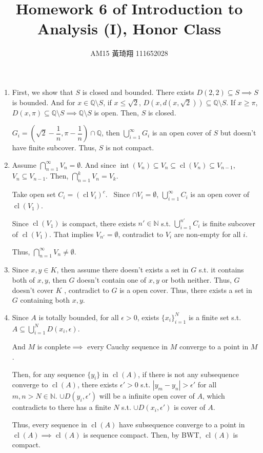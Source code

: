 \documentclass[12pt]{article}
\title{Homework 6 of Introduction to Analysis (I), Honor Class}
\author{AM15 黃琦翔 111652028}
\DeclareMathOperator{\closure}{cl}
\DeclareMathOperator{\interior}{int}
\begin{document}
\maketitle
\begin{enumerate}
    \item First, we show that $S$ is closed and bounded. There exists $D(2, 2) \subseteq S\implies S$ is bounded.
    And for $x\in \mathbb{Q}\setminus S$, if $x\leq \sqrt{2}$, $D(x, d(x, \sqrt{2}))\subseteq \mathbb{Q}\setminus S$. If $x\geq \pi$, $D(x, \pi) \subseteq \mathbb{Q}\setminus S\implies \mathbb{Q}\setminus S$ is open.
    Then, $S$ is closed.

    $G_i = (\sqrt{2} - \dfrac{1}{n}, \pi - \dfrac{1}{n}) \cap \mathbb{Q}$, then $\displaystyle\bigcup_{i=1}^{\infty} G_i$ is an open cover of $S$ but doesn't have finite subcover.
    Thus, $S$ is not compact.

    \item Assume $\displaystyle\bigcap_{n=1}^{\infty} V_n = \emptyset$.
    And since $\interior(V_n) \subseteq V_n \subseteq \closure(V_n) \subseteq V_{n-1}$, $V_n \subseteq V_{n-1}$.
    Then, $\displaystyle\bigcap_{n=1}^{k} V_n = V_k$.

    Take open set $C_i = (\closure V_i)^c$. \
    Since $\cap V_i = \emptyset$, $\displaystyle\bigcup_{i=1}^{\infty} C_i$ is an open cover of $\closure(V_1)$.

    Since $\closure(V_1)$ is compact, there exists $n' \in \mathbb{N}$ s.t. $\displaystyle\bigcup_{i=1}^{n'} C_i$ is finite subcover of $\closure(V_1)$.
    That implies $V_{n'} = \emptyset$, contradict to $V_i$ are non-empty for all $i$.

    Thus, $\displaystyle\bigcap_{n=1}^{\infty} V_n \neq \emptyset$.

    \item Since $x, y\in K$, then assume there doesn't exists a set in $G$ s.t. it contains both of $x, y$, then $G$ doesn't contain one of $x, y$ or both neither.
    Thus, $G$ doesn't cover $K$ , contradict to $G$ is a open cover. Thus, there exists a set in $G$ containing both $x, y$.

    \newpage
    \item Since $A$ is totally bounded, for all $\epsilon > 0$, exists $\lbrace x_i\rbrace_{i=1}^N$ is a finite set s.t. $A \subseteq \displaystyle\bigcup_{i=1}^N D(x_i, \epsilon)$.
    
    And $M$ is conplete$\implies$ every Cauchy sequence in $M$ converge to a point in $M$.

    Then, for any sequence $\lbrace y_i\rbrace$ in $\closure(A)$, if there is not any subsequence converge to $\closure(A)$, there exists $\epsilon' > 0$ s.t. $|y_m-y_n| > \epsilon'$ for all $m, n > N\in \mathbb{N}$.
    $\cup D(y_i, \epsilon')$ will be a infinite open cover of $A$, which contradicts to there has a finite $N$ s.t. $\cup D(x_i, \epsilon')$ is cover of $A$.

    Thus, every sequence in $\closure(A)$ have subsequence converge to a point in $\closure(A)\implies \closure(A)$ is sequence compact.
    Then, by BWT, $\closure(A)$ is compact.
\end{enumerate}
\end{document}
